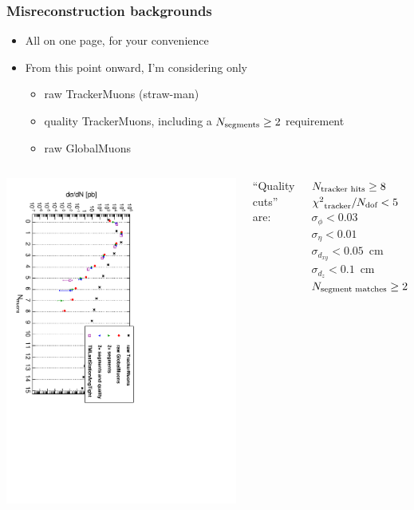 \documentclass[compress]{beamer}
\newcommand{\s}[1]{{\mbox{\scriptsize #1}}}
\begin{document}
\begin{frame}
\frametitle{Misreconstruction backgrounds}

\begin{itemize}
\item All on one page, for your convenience
\item From this point onward, I'm considering only
\begin{itemize}
\item raw TrackerMuons (straw-man)
\item quality TrackerMuons, including a $N_\s{segments} \ge 2$ requirement
\item raw GlobalMuons
\end{itemize}
\end{itemize}

\begin{columns}
\includegraphics[height=\linewidth, angle=90]{tracks_samepage_allreal.pdf}

\scriptsize ``Quality cuts'' are:

$N_\s{tracker hits} \ge 8$ \\
${\chi^2}_\s{tracker}/N_\s{dof} < 5$ \\
$\sigma_\phi < 0.03$ \\
$\sigma_\eta < 0.01$ \\
$\sigma_{d_{xy}} < 0.05$~cm \\
$\sigma_{d_z} < 0.1$~cm \\
$N_\s{segment matches} \ge 2$
\end{columns}
\end{frame}
\end{document}
